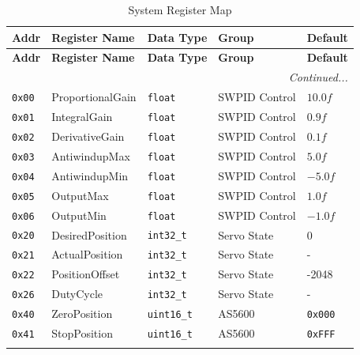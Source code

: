 \begin{longtable}{@{} l l l l l @{}}
\caption{System Register Map} \\

\toprule
\textbf{Addr} & \textbf{Register Name} & \textbf{Data Type} & \textbf{Group} & \textbf{Default} \\
\midrule
\endfirsthead

\toprule
\textbf{Addr} & \textbf{Register Name} & \textbf{Data Type} & \textbf{Group} & \textbf{Default} \\
\midrule
\endhead

\midrule
\multicolumn{5}{r}{\textit{Continued...}} \\
\bottomrule
\endfoot

\bottomrule
\endlastfoot


\texttt{0x00} & ProportionalGain   & \texttt{float}    & SWPID Control & $10.0f$ \\
\texttt{0x01} & IntegralGain       & \texttt{float}    & SWPID Control & $0.9f$ \\
\texttt{0x02} & DerivativeGain     & \texttt{float}    & SWPID Control & $0.1f$ \\
\texttt{0x03} & AntiwindupMax      & \texttt{float}    & SWPID Control & $5.0f$ \\
\texttt{0x04} & AntiwindupMin      & \texttt{float}    & SWPID Control & $-5.0f$ \\
\texttt{0x05} & OutputMax          & \texttt{float}    & SWPID Control & $1.0f$ \\
\texttt{0x06} & OutputMin          & \texttt{float}    & SWPID Control & $-1.0f$ \\
\addlinespace

\texttt{0x20} & DesiredPosition    & \texttt{int32\_t}  & Servo State & 0 \\
\texttt{0x21} & ActualPosition     & \texttt{int32\_t}  & Servo State & - \\
\texttt{0x22} & PositionOffset     & \texttt{int32\_t}  & Servo State & -2048 \\
\texttt{0x26} & DutyCycle          & \texttt{int32\_t}  & Servo State & - \\
\addlinespace

\texttt{0x40} & ZeroPosition       & \texttt{uint16\_t} & AS5600     & \texttt{0x000} \\
\texttt{0x41} & StopPosition       & \texttt{uint16\_t} & AS5600     & \texttt{0xFFF} \\
\addlinespace

\end{longtable}


